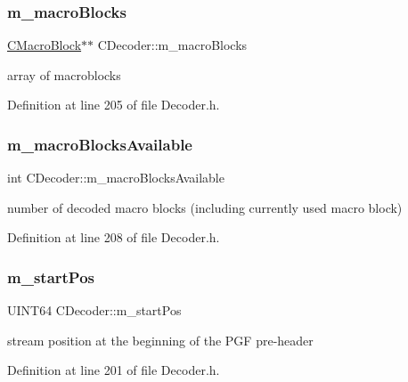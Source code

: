 \subsubsection{\texorpdfstring{m\_macroBlocks}{m\_macroBlocks}}
{\footnotesize\ttfamily \mbox{\hyperlink{classCDecoder_1_1CMacroBlock}{C\+Macro\+Block}}$\ast$$\ast$ C\+Decoder\+::m\+\_\+macro\+Blocks\hspace{0.3cm}{\ttfamily [private]}}



array of macroblocks 



Definition at line 205 of file Decoder.\+h.

\mbox{\label{classCDecoder_a542f95c68cc1661b3629a3cf026f45c4}} 
\subsubsection{\texorpdfstring{m\_macroBlocksAvailable}{m\_macroBlocksAvailable}}
{\footnotesize\ttfamily int C\+Decoder\+::m\+\_\+macro\+Blocks\+Available\hspace{0.3cm}{\ttfamily [private]}}



number of decoded macro blocks (including currently used macro block) 



Definition at line 208 of file Decoder.\+h.

\mbox{\label{classCDecoder_a56f84d5e2dc9f94737e9ff76a017eab7}} 
\subsubsection{\texorpdfstring{m\_startPos}{m\_startPos}}
{\footnotesize\ttfamily U\+I\+N\+T64 C\+Decoder\+::m\+\_\+start\+Pos\hspace{0.3cm}{\ttfamily [private]}}



stream position at the beginning of the P\+GF pre-\/header 



Definition at line 201 of file Decoder.\+h.

